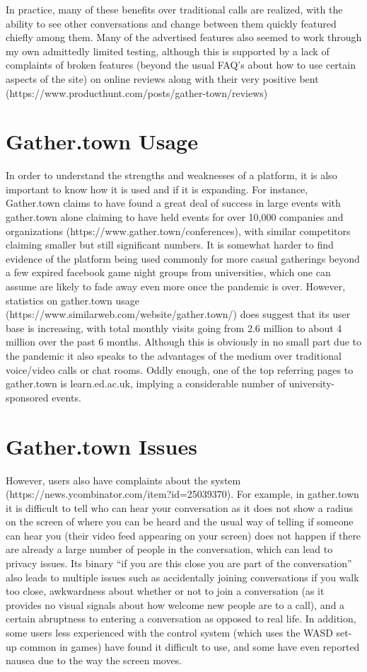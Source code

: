 \documentclass[bsc,frontabs,singlespacing,parskip,deptreport]{infthesis}
\begin{document}
In practice, many of these benefits over traditional calls are realized, with the ability to see other conversations and change between them quickly featured chiefly among them.  Many of the advertised features also seemed to work through my own admittedly limited testing, although this is supported by a lack of complaints of broken features (beyond the usual FAQ’s about how to use certain aspects of the site) on online reviews along with their very positive bent (https://www.producthunt.com/posts/gather-town/reviews)

\section{Gather.town Usage}

In order to understand the strengths and weaknesses of a platform, it is also important to know how it is used and if it is expanding.  For instance, Gather.town claims to have found a great deal of success in large events with gather.town alone claiming to have held events for over 10,000 companies and organizations (https://www.gather.town/conferences), with similar competitors claiming smaller but still significant numbers.  It is somewhat harder to find evidence of the platform being used commonly for more casual gatherings beyond a few expired facebook game night groups from universities, which one can assume are likely to fade away even more once the pandemic is over.  However, statistics on gather.town usage (https://www.similarweb.com/website/gather.town/) does suggest that its user base is increasing, with total monthly visits going from 2.6 million to about 4 million over the past 6 months.   Although this is obviously in no small part due to the pandemic it also speaks to the advantages of the medium over traditional voice/video calls or chat rooms. Oddly enough, one of the top referring pages to gather.town is learn.ed.ac.uk, implying a considerable number of university-sponsored events.

\section{Gather.town Issues}

However, users also have complaints about the system (https://news.ycombinator.com/item?id=25039370).  For example, in gather.town it is difficult to tell who can hear your conversation as it does not show a radius on the screen of where you can be heard and the usual way of telling if someone can hear you (their video feed appearing on your screen) does not happen if there are already a large number of people in the conversation, which can lead to privacy issues.  Its binary “if you are this close you are part of the conversation” also leads to multiple issues such as accidentally joining conversations if you walk too close, awkwardness about whether or not to join a conversation (as it provides no visual signals about how welcome new people are to a call), and a certain abruptness to entering a conversation as opposed to real life.  In addition, some users less experienced with the control system (which uses the WASD set-up common in games) have found it difficult to use, and some have even reported nausea due to the way the screen moves.
\end{document}
